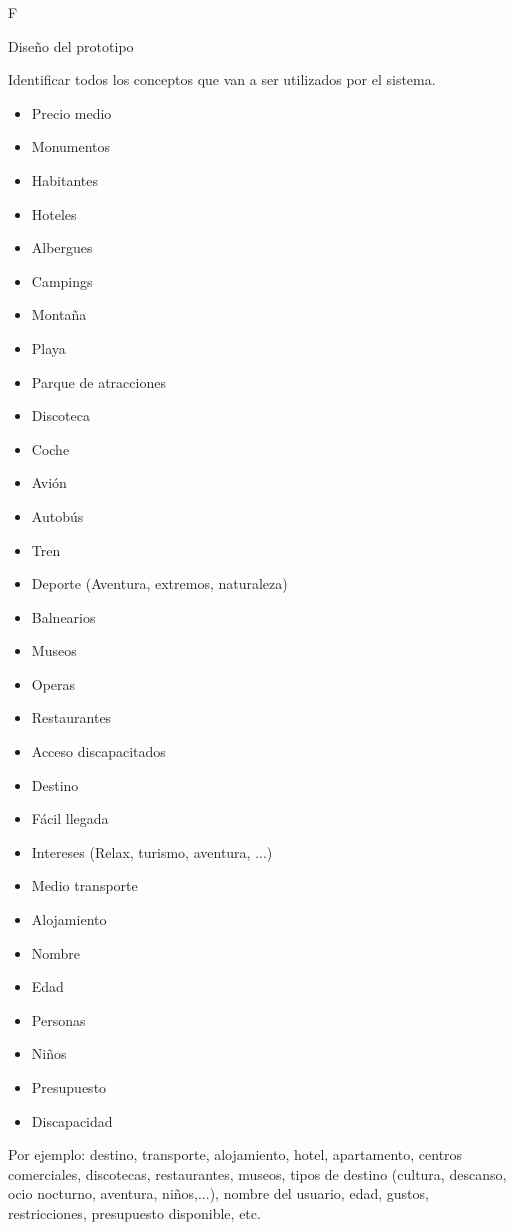 F\documentclass[11pt, a4paper, spanish, openright, twoside]{book}
\begin{document}
\begin{section}{Diseño del prototipo}

	\begin{subsection}{Identificar todos los conceptos que van a ser utilizados por el sistema.}

		\begin{itemize}
			\item Precio medio
			\item Monumentos
			\item Habitantes			
			\item Hoteles
			\item Albergues
			\item Campings
			\item Montaña
			\item Playa
			\item Parque de atracciones
			\item Discoteca
			\item Coche
			\item Avión
			\item Autobús
			\item Tren
			\item Deporte (Aventura, extremos, naturaleza)
			\item Balnearios
			\item Museos
			\item Operas
			\item Restaurantes
			\item Acceso discapacitados
			\item Destino
			\item Fácil llegada
			\item Intereses (Relax,  turismo, aventura, ...)
			\item Medio transporte
			\item Alojamiento
			\item Nombre
			\item Edad
			\item Personas
			\item Niños
			\item Presupuesto
			\item Discapacidad



		\end{itemize}

	 Por ejemplo: destino, transporte, alojamiento, hotel, apartamento, centros comerciales, 
	discotecas, restaurantes, museos, tipos de destino (cultura, descanso, ocio nocturno, 
	aventura, niños,...), nombre del	usuario, edad, gustos, restricciones, presupuesto disponible, etc.


\end{subsection}
\end{section}
\end{document}
